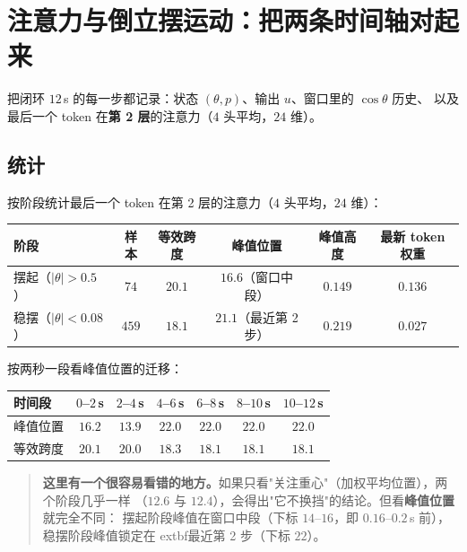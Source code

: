 \section{注意力与倒立摆运动：把两条时间轴对起来}

把闭环 $12$\,s 的每一步都记录：状态 $(\theta,p)$、输出 $u$、窗口里的 $\cos\theta$ 历史、
以及最后一个 token 在\textbf{第 2 层}的注意力（$4$ 头平均，$24$ 维）。

\subsection{统计}

按阶段统计最后一个 token 在第 2 层的注意力（$4$ 头平均，$24$ 维）：

\begin{center}
\small
\begin{tabular}{@{}lccccc@{}}
\toprule
阶段 & 样本 & 等效跨度 & \textbf{峰值位置} & 峰值高度 & 最新 token 权重 \\
\midrule
摆起（$|\theta|>0.5$） & $74$ & $20.1$ & $16.6$（窗口中段） & $0.149$ & $0.136$ \\
稳摆（$|\theta|<0.08$） & $459$ & $18.1$ & $\mathbf{21.1}$（最近第 2 步） & $0.219$ & $0.027$ \\
\bottomrule
\end{tabular}
\end{center}

按两秒一段看峰值位置的迁移：

\begin{center}
\small
\begin{tabular}{@{}lcccccc@{}}
\toprule
时间段 & $0$--$2$\,s & $2$--$4$\,s & $4$--$6$\,s & $6$--$8$\,s & $8$--$10$\,s & $10$--$12$\,s \\
\midrule
峰值位置 & $16.2$ & $13.9$ & $22.0$ & $22.0$ & $22.0$ & $22.0$ \\
等效跨度 & $20.1$ & $20.0$ & $18.3$ & $18.1$ & $18.1$ & $18.1$ \\
\bottomrule
\end{tabular}
\end{center}

\begin{quote}
\textbf{这里有一个很容易看错的地方。}如果只看"关注重心"（加权平均位置），两个阶段几乎一样
（$12.6$ 与 $12.4$），会得出"它不换挡"的结论。但看\textbf{峰值位置}就完全不同：
摆起阶段峰值在窗口中段（下标 $14$--$16$，即 $0.16$--$0.2$\,s 前），
稳摆阶段峰值锁定在	extbf{最近第 2 步}（下标 $22$）。
\end{quote}

